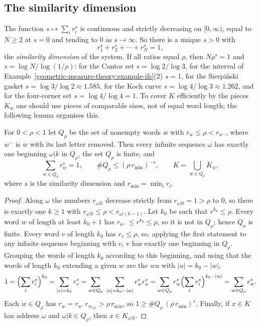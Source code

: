 \subsection{The similarity dimension}\label{geometric-measure-theory:subsection-similarity-dimension}

The function $s \mapsto \sum_ir_i^s$ is continuous and strictly decreasing on $[0, \infty)$, equal to $N \geq 2$ at $s = 0$ and tending to $0$ as $s \to \infty$. So there is a unique $s > 0$ with
\begin{equation}\label{geometric-measure-theory:equation-moran}
r_1^s + r_2^s + \cdots + r_N^s = 1,
\end{equation}
the \emph{similarity dimension} of the system. If all ratios equal $\rho$, then $N\rho^s = 1$ and $s = \log N/\log(1/\rho)$: for the Cantor set $s = \log 2/\log 3$, for the interval of
Example~\ref{geometric-measure-theory:example-ifs}(2) $s = 1$, for the Sierpi\'nski gasket $s = \log 3/\log 2 \approx 1.585$, for the Koch curve $s = \log 4/\log 3 \approx 1.262$, and for the
four-corner set $s = \log 4/\log 4 = 1$. To cover $K$ efficiently by the pieces $K_w$ one should use pieces of comparable sizes, not of equal word length; the following lemma organises this.

\begin{lemma}\label{geometric-measure-theory:lemma-cut-sets}
For $0 < \rho < 1$ let $Q_\rho$ be the set of nonempty words $w$ with $r_w \leq \rho < r_{w^-}$, where $w^-$ is $w$ with its last letter removed. Then every infinite sequence $\omega$ has exactly one
beginning $\omega|k$ in $Q_\rho$, the set $Q_\rho$ is finite, and
\[
\sum_{w \in Q_\rho}r_w^s = 1, \qquad \#Q_\rho \leq (\rho\,r_{\min})^{-s}, \qquad K = \bigcup_{w \in Q_\rho}K_w,
\]
where $s$ is the similarity dimension and $r_{\min} = \min_ir_i$.
\end{lemma}

\begin{proof}
Along $\omega$ the numbers $r_{\omega|k}$ decrease strictly from $r_{\omega|0} = 1 > \rho$ to $0$, so there is exactly one $k \geq 1$ with $r_{\omega|k} \leq \rho < r_{\omega|(k - 1)}$. Let $k_0$ be such
that $r^{k_0} \leq \rho$. Every word $w$ of length at least $k_0 + 1$ has $r_{w^-} \leq r^{k_0} \leq \rho$, so it is not in $Q_\rho$; hence $Q_\rho$ is finite. Every word $v$ of length $k_0$ has
$r_v \leq \rho$, so, applying the first statement to any infinite sequence beginning with $v$, $v$ has exactly one beginning in $Q_\rho$. Grouping the words of length $k_0$ according to this beginning,
and using that the words of length $k_0$ extending a given $w$ are the $wu$ with $|u| = k_0 - |w|$,
\[
1 = \Bigl(\sum_ir_i^s\Bigr)^{k_0} = \sum_{|v| = k_0}r_v^s = \sum_{w \in Q_\rho}\ \sum_{|u| = k_0 - |w|}r_w^sr_u^s = \sum_{w \in Q_\rho}r_w^s\Bigl(\sum_ir_i^s\Bigr)^{k_0 - |w|} = \sum_{w \in Q_\rho}r_w^s .
\]
Each $w \in Q_\rho$ has $r_w = r_{w^-}r_{w_{|w|}} > \rho\,r_{\min}$, so $1 \geq \#Q_\rho\,(\rho\,r_{\min})^s$. Finally, if $x \in K$ has address $\omega$ and $\omega|k \in Q_\rho$, then
$x \in K_{\omega|k}$.
\end{proof}

